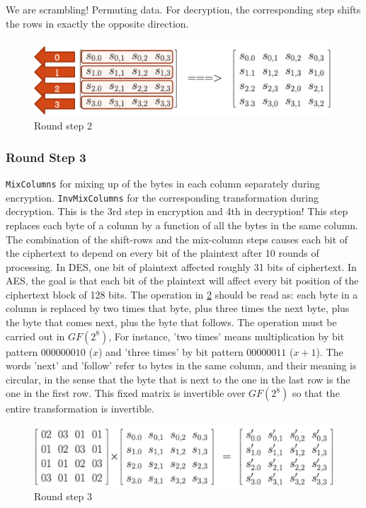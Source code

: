 We are scrambling! Permuting data. For decryption, the corresponding step shifts the rows in exactly the opposite direction.

\begin{figure}
	\centering
	\includegraphics[width=0.7\linewidth]{Images/Chapter3/Round_Step2}
	\caption{Round step 2}
	\label{fig:Round_Step2}
\end{figure}


\subsubsection{Round Step 3}

\texttt{MixColumns} for mixing up of the bytes in each column separately during encryption. \texttt{InvMixColumns} for the corresponding transformation during decryption. This is the 3rd step in encryption and 4th in decryption! This step replaces each byte of a column by a function of all the bytes in the same column. The combination of the shift-rows and the mix-column steps causes each bit of the ciphertext to depend on every bit of the plaintext after 10 rounds of processing. In DES, one bit of plaintext affected roughly 31 bits of ciphertext. In AES, the goal is that each bit of the plaintext will affect every bit position of the ciphertext block of 128 bits. The operation in \ref{fig:Round_Step3} should be read as: each byte in a column is replaced by two times that byte, plus three times the next byte, plus the byte that comes next, plus the byte that follows. The operation must be carried out in $GF(2^8)$, For instance, 'two times' means multiplication by bit pattern $000000010$ ($x$) and 'three times' by bit pattern $00000011$ ($x + 1$). The words 'next' and 'follow' refer to bytes in the same column, and their meaning is circular, in the sense that the byte that is next to the one in the last row is the one in the first row. This fixed matrix is invertible over $GF(2^8)$ so that the entire transformation is invertible.


\begin{figure}
	\centering
	\includegraphics[width=0.7\linewidth]{Images/Chapter3/Round_Step3}
	\caption{Round step 3}
	\label{fig:Round_Step3}
\end{figure}

